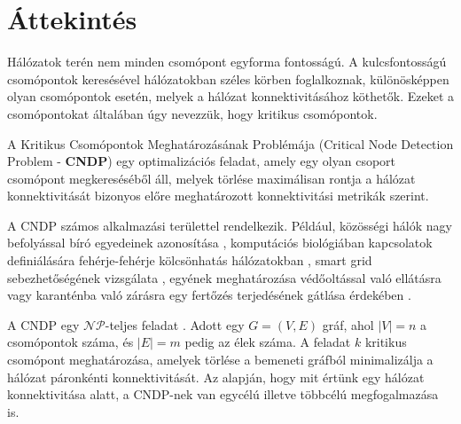\section{Áttekintés}\label{sec:ATTEKINTES}

Hálózatok terén nem minden csomópont egyforma fontosságú.
A kulcsfontosságú csomópontok keresésével hálózatokban széles körben foglalkoznak,
különösképpen olyan csomópontok esetén, melyek a hálózat konnektivitásához köthetők.
Ezeket a csomópontokat általában úgy nevezzük, hogy kritikus csomópontok.

A Kritikus Csomópontok Meghatározásának Problémája (Critical Node Detection Problem - \textbf{CNDP})
egy optimalizációs feladat, amely egy olyan csoport csomópont
megkereséséből áll, melyek törlése maximálisan rontja a hálózat
konnektivitását bizonyos előre meghatározott konnektivitási metrikák szerint.

A CNDP számos alkalmazási területtel rendelkezik.
Például, közösségi hálók nagy befolyással bíró egyedeinek azonosítása \cite{kempe2005influential},
komputációs biológiában kapcsolatok definiálására fehérje-fehérje kölcsönhatás hálózatokban \cite{boginski2009identifying, tomaino2012studying},
smart grid sebezhetőségének vizsgálata \cite{nguyen2013detecting},
egyének meghatározása védőoltással való ellátásra vagy karanténba való zárásra egy fertőzés terjedésének gátlása érdekében \cite{ventresca2013evaluation, ventresca2014randomized, aspnes2006inoculation}.

A CNDP egy $\mathcal{N}\mathcal{P}$-teljes feladat \cite{arulselvan2009detecting}. Adott egy $G = (V, E)$ gráf, ahol $|V| = n$ a csomópontok száma,
és $|E| = m$ pedig az élek száma. A feladat $k$ kritikus csomópont meghatározása, amelyek törlése a bemeneti
gráfból minimalizálja a hálózat páronkénti konnektivitását. Az alapján, hogy mit értünk egy hálózat
konnektivitása alatt, a CNDP-nek van egycélú illetve többcélú megfogalmazása is.
